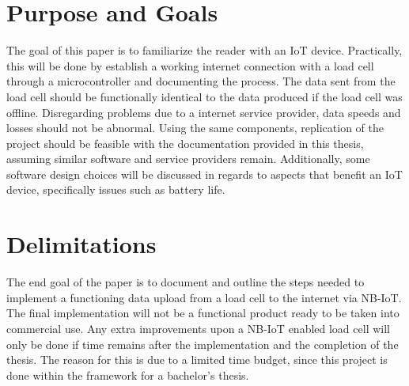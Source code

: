 \section{Purpose and Goals}

The goal of this paper is to familiarize the reader with an IoT device. Practically, this will be done by establish a working internet connection with a load cell through a microcontroller and documenting the process. The data sent from the load cell should be functionally identical to the data produced if the load cell was offline. Disregarding problems due to a internet service provider, data speeds and losses should not be abnormal. Using the same components, replication of the project should be feasible with the documentation provided in this thesis, assuming similar software and service providers remain. Additionally, some software design choices will be discussed in regards to aspects that benefit an IoT device, specifically issues such as battery life.


\section{Delimitations}
The end goal of the paper is to document and outline the steps needed to implement a functioning data upload from a load cell to the internet via NB-IoT. The final implementation will not be a functional product ready to be taken into commercial use. Any extra improvements upon a NB-IoT enabled load cell will only be done if time remains after the implementation and the completion of the thesis. The reason for this is due to a limited time budget, since this project is done within the framework for a bachelor's thesis.


